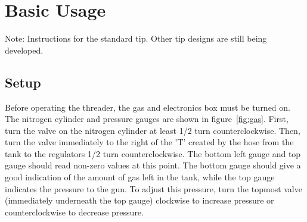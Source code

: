 \documentclass[letterpaper,12pt]{article}
\begin{document}
\section{Basic Usage}
Note: Instructions for the standard tip. Other tip designs are still being developed.
\subsection{Setup}
Before operating the threader, the gas and electronics box must be turned on. The nitrogen cylinder and pressure gauges are shown in figure~\ref{fig:gas}. First, turn the valve on the nitrogen cylinder at least 1/2 turn counterclockwise. Then, turn the valve immediately to the right of the 'T' created by the hose from the tank to the regulators 1/2 turn counterclockwise. The bottom left gauge and top gauge should read non-zero values at this point. The bottom gauge should give a good indication of the amount of gas left in the tank, while the top gauge indicates the pressure to the gun. To adjust this pressure, turn the topmost valve (immediately underneath the top gauge) clockwise to increase pressure or counterclockwise to decrease pressure. \par
{}
\end{document}
